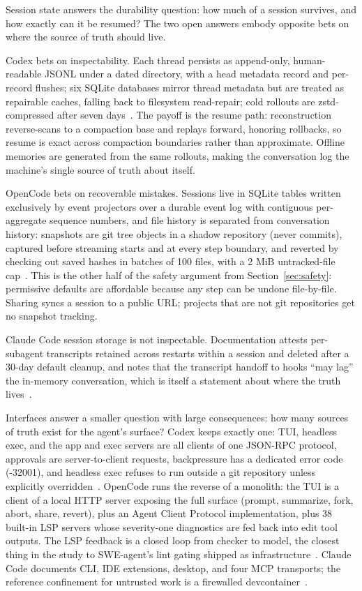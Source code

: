 \documentclass{article}
\newcommand{\codex}[0]{Codex}
\newcommand{\occ}[0]{OpenCode}
\newcommand{\ccc}[0]{Claude Code}
\begin{document}
Session state answers the durability question: how much of a session
survives, and how exactly can it be resumed? The two open answers embody
opposite bets on where the source of truth should live.

\codex{} bets on inspectability. Each thread persists as append-only,
human-readable JSONL under a dated directory, with a head metadata record
and per-record flushes; six SQLite databases mirror thread metadata but
are treated as repairable caches, falling back to filesystem read-repair;
cold rollouts are zstd-compressed after seven days~\citep{codexRepo}. The
payoff is the resume path: reconstruction reverse-scans to a compaction
base and replays forward, honoring rollbacks, so resume is exact across
compaction boundaries rather than approximate. Offline memories are
generated from the same rollouts, making the conversation log the
machine's single source of truth about itself.

\occ{} bets on recoverable mistakes. Sessions live in SQLite tables
written exclusively by event projectors over a durable event log with
contiguous per-aggregate sequence numbers, and file history is separated
from conversation history: snapshots are git tree objects in a shadow
repository (never commits), captured before streaming starts and at every
step boundary, and reverted by checking out saved hashes in batches of
100 files, with a 2 MiB untracked-file cap~\citep{opencodeRepo}. This is
the other half of the safety argument from
Section~\ref{sec:safety}: permissive defaults are affordable because any
step can be undone file-by-file. Sharing syncs a session to a public URL;
projects that are not git repositories get no snapshot tracking.

\ccc{} session storage is not inspectable. Documentation attests
per-subagent transcripts retained across restarts within a session and
deleted after a 30-day default cleanup, and notes that the transcript
handoff to hooks ``may lag'' the in-memory conversation, which is itself
a statement about where the truth
lives~\citep{claudeCodeSubagentsDocs,claudeCodeHooksDocs}.

Interfaces answer a smaller question with large consequences: how many
sources of truth exist for the agent's surface? \codex{} keeps exactly
one: TUI, headless exec, and the app and exec servers are all clients of
one JSON-RPC protocol, approvals are server-to-client requests,
backpressure has a dedicated error code (-32001), and headless exec
refuses to run outside a git repository unless explicitly
overridden~\citep{codexRepo}. \occ{} runs the reverse of a monolith: the
TUI is a client of a local HTTP server exposing the full surface (prompt,
summarize, fork, abort, share, revert), plus an Agent Client Protocol
implementation, plus 38 built-in LSP servers whose severity-one
diagnostics are fed back into edit tool outputs. The LSP feedback is a
closed loop from checker to model, the closest thing in the study to
SWE-agent's lint gating shipped as
infrastructure~\citep{opencodeRepo,yang2024sweagent}. \ccc{} documents
CLI, IDE extensions, desktop, and four MCP transports; the reference
confinement for untrusted work is a firewalled
devcontainer~\citep{claudeCodePermissionsDocs,claudeCodeMcpDocs,%
claudeCodeSurface}.
\end{document}
